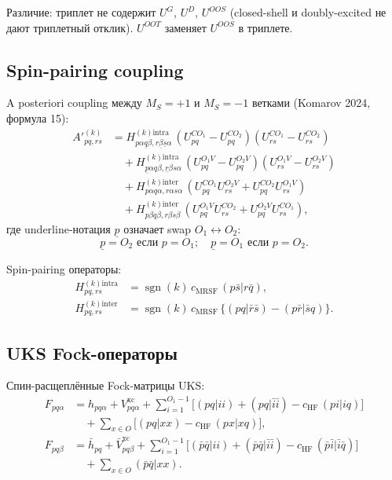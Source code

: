 \documentclass[11pt, a4paper]{article}
\theoremstyle{definition}
\newcommand{\sgn}{\operatorname{sgn}}
\newcommand{\Hkintra}{H^{(k)\text{intra}}}
\newcommand{\Hkinter}{H^{(k)\text{inter}}}
\newcommand{\Akprime}{{A'}^{(k)}}
\newcommand{\HF}{\text{HF}}
\newcommand{\MRSF}{\text{MRSF}}
\newcommand{\xc}{\text{xc}}
\begin{document}
Различие: триплет не содержит $U^G$, $U^D$, $U^{OOS}$ (closed-shell и doubly-excited не дают триплетный отклик). $U^{OOT}$ заменяет $U^{OOS}$ в триплете.

\subsection{Spin-pairing coupling}

A posteriori coupling между $M_S = +1$ и $M_S = -1$ ветками (Komarov 2024, формула 15):
\begin{align}
    \Akprime_{pq, rs}
    &= \Hkintra_{p\alpha \underline{q}\beta, r\underline{\beta} \underline{s}\alpha}\, (U^{CO_1}_{pq} - U^{CO_2}_{pq})(U^{CO_1}_{rs} - U^{CO_2}_{rs}) \nonumber\\
    &\quad + \Hkintra_{\underline{p}\alpha q\beta, \underline{r}\beta s\alpha}\, (U^{O_1V}_{pq} - U^{O_2V}_{pq})(U^{O_1V}_{rs} - U^{O_2V}_{rs}) \nonumber\\
    &\quad + \Hkinter_{p\alpha q\alpha, r\alpha s\alpha}\, (U^{CO_1}_{pq} U^{O_2V}_{rs} + U^{CO_2}_{pq} U^{O_1V}_{rs}) \nonumber\\
    &\quad + \Hkinter_{p\beta q\beta, r\beta s\beta}\, (U^{O_1V}_{pq} U^{CO_2}_{rs} + U^{O_2V}_{pq} U^{CO_1}_{rs}),
    \label{eq:Aprime}
\end{align}
где underline-нотация $\underline{p}$ означает swap $O_1 \leftrightarrow O_2$:
\begin{equation}
    \underline{p} = O_2 \text{ если } p = O_1; \quad \underline{p} = O_1 \text{ если } p = O_2.
\end{equation}

Spin-pairing операторы:
\begin{align}
    \Hkintra_{pq, rs} &= \sgn(k)\, c_{\MRSF}\, (p\bar s | r \bar q), \label{eq:Hintra} \\
    \Hkinter_{pq, rs} &= \sgn(k)\, c_{\MRSF}\, \bigl\{ (pq | \bar r \bar s) - (p \bar r | \bar s q) \bigr\}. \label{eq:Hinter}
\end{align}

\subsection{UKS Fock-операторы}

Спин-расщеплённые Fock-матрицы UKS:
\begin{align}
    F_{pq\alpha} &= h_{pq\alpha} + V^{\xc}_{pq\alpha} + \sum_{i=1}^{O_1 - 1} \bigl[(pq | ii) + (pq | \bar i \bar i) - c_{\HF}\, (pi | iq)\bigr] \nonumber\\
    &\quad + \sum_{x \in O} \bigl[(pq | xx) - c_{\HF}\, (px | xq)\bigr], \label{eq:Falpha} \\
    F_{pq\beta} &= \bar h_{pq} + \bar V^{\xc}_{pq\beta} + \sum_{i=1}^{O_1 - 1} \bigl[(\bar p \bar q | ii) + (\bar p \bar q | \bar i \bar i) - c_{\HF}\, (\bar p \bar i | \bar i \bar q)\bigr] \nonumber\\
    &\quad + \sum_{x \in O} (\bar p \bar q | xx). \label{eq:Fbeta}
\end{align}
\end{document}
